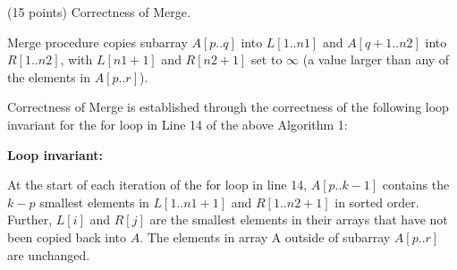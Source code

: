\documentclass[12pt]{article}
\begin{document}
 (15 points)
Correctness of Merge.

Merge procedure copies subarray $A[p..q]$ into $L[1..n1]$ and $A[q+1..n2]$ into $R[1..n2]$, with $L[n1+1]$
and $R[n2 + 1]$ set to $\infty$ (a value larger than any of the elements in $A[p..r]$).

Correctness of Merge is established through the correctness of the following loop
invariant for the for loop in Line 14 of the above Algorithm 1:

{\bf Loop invariant: } 

At the start of each iteration of the for loop in line 14, $A[p..k -1]$ contains the $k-p$ smallest
elements in $L[1..n1 + 1]$ and $R[1..n2 + 1]$ in sorted order. Further, $L[i]$ and $R[j]$ are the
smallest elements in their arrays that have not been copied back into $A.$ The elements in
array A outside of subarray $A[p..r]$ are unchanged.
\end{document}
